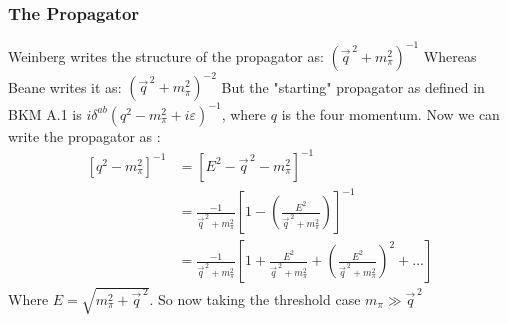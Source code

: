 \documentclass[11pt]{article}
\newcommand\ddfrac[2]{\frac{\displaystyle #1}{\displaystyle #2}}
\newcommand\mm{\mathcal{M}}
\newcommand{\sq}{^{\,2}}
\begin{document}


\subsubsection{The Propagator}
Weinberg writes the structure of the propagator as:
$(\vec{q}\sq +m_\pi^2)^{-1} $
Whereas Beane writes it as:
$(\vec{q}\sq +m_\pi^2)^{-2}$
But the "starting" propagator as defined in BKM A.1 is 
$i \delta^{ab} \left( q^2 -m_\pi^2 + i \varepsilon \right)^{-1}$, where $q$ is the four momentum.
Now we can write the propagator as :
\begin{align}
    \left[ q^2-m_\pi^2 \right]^{-1}&= \left[ E^2 -\vec{q}\sq -m_\pi^2 \right]^{-1}\\
                                   &= \frac{-1}{\vec{q}\sq +m_\pi^2} \left[ 1- \left( \ddfrac{E^2}{\vec{q}\sq +
                                   m_\pi^2}  \right) \right]^{-1}\\
                                   &= \frac{-1}{\vec{q}\sq +m_\pi^2} \left[ 1 + \frac{E^2}{\vec{q}\sq +m_\pi^2}+
                                   \left(\frac{E^2}{\vec{q}\sq +m_\pi^2}\right)^2 +... \right]
\end{align}
Where $E=\sqrt{m_\pi^2 + \vec{q}\sq}$. So now taking the threshold case $m_\pi\gg\vec{q}\sq$
\end{document}
